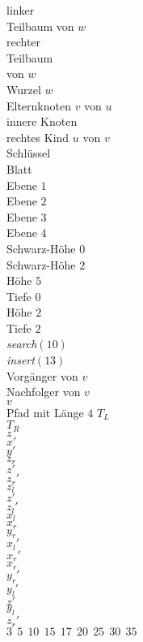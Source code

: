 \documentclass[a4paper,12pt]{article}
\begin{document}
\raggedright
\color{black}
linker\\ Teilbaum von $w$\\
rechter\\ Teilbaum \\ von $w$\\
Wurzel $w$\\
Elternknoten $v$ von $u$\\
innere Knoten\\
rechtes Kind $u$ von $v$\\
Schlüssel\\
Blatt\\
Ebene $1$ \\
Ebene $2$ \\  
Ebene $3$ \\  
Ebene $4$ \\
Schwarz-Höhe 0\\
Schwarz-Höhe 2\\
Höhe $5$\\
Tiefe $0$\\
Höhe $2$\\
Tiefe $2$\\
\textit{search}$\left(10\right)$\\
\textit{insert}$\left(13\right)$\\
Vorgänger von $v$\\
Nachfolger von $v$\\
$v$\\
Pfad mit Länge $4$
\color{Black}
$T_L$\\
$T_R$\\
$z$\\
$x'$\\
$y'$\\
$z_r$\\
$z'$\\
${z_r}'$\\
$z_l$\\
$z'$\\
${z_l}'$\\
$x_l$\\
$x_r$\\
$y_r$\\
${x_l}'$\\
${x_r}'$\\
${x_r}$\\
${y_r}'$\\
${y_l}'$\\
$z'$\\
${y_l}$\\
${z_r}'$\\
$3~~5~~10~~15~~17~~20~~25~~30~~35$ \\
\end{document}
